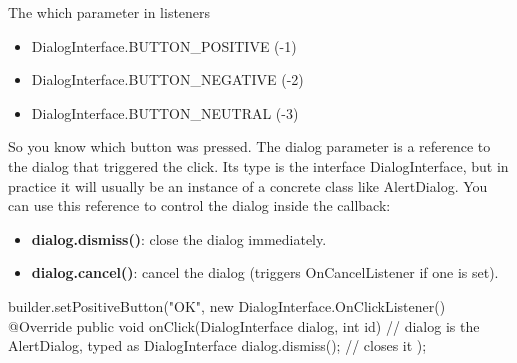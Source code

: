 \documentclass{report}
\begin{document}
\begin{itemize}
\begin{javacode}
{{                    }
                }
            \end{javacode}
            \bigbreak \noindent 
            The which parameter in listeners
            \begin{itemize}
                \item DialogInterface.BUTTON\_POSITIVE (-1)
                \item DialogInterface.BUTTON\_NEGATIVE (-2)
                \item DialogInterface.BUTTON\_NEUTRAL (-3)
            \end{itemize}
            So you know which button was pressed.
            \bigbreak \noindent 
            The dialog parameter is a reference to the dialog that triggered the click. Its type is the interface DialogInterface, but in practice it will usually be an instance of a concrete class like AlertDialog.
            You can use this reference to control the dialog inside the callback:
            \begin{itemize}
                \item \textbf{dialog.dismiss()}: close the dialog immediately.
                \item \textbf{dialog.cancel()}: cancel the dialog (triggers OnCancelListener if one is set).
            \end{itemize}
            \bigbreak \noindent 
            \begin{javacode}
                builder.setPositiveButton("OK", new DialogInterface.OnClickListener() {
                    @Override
                    public void onClick(DialogInterface dialog, int id) {
                        // dialog is the AlertDialog, typed as DialogInterface
                        dialog.dismiss();   // closes it
                    }
                });
            \end{javacode}

    \end{itemize}

    \pagebreak 
\end{document}
